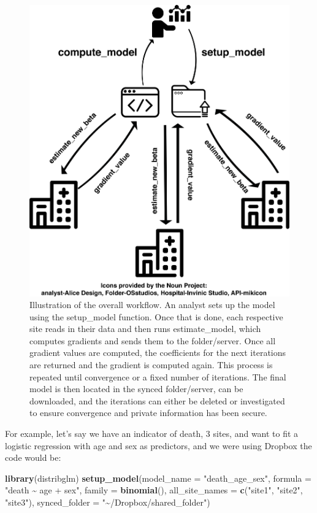 \documentclass[]{elsarticle} %
\newenvironment{Shaded}{\begin{snugshade}}{\end{snugshade}}
\newcommand{\DataTypeTok}[1]{\textcolor[rgb]{0.13,0.29,0.53}{#1}}
\newcommand{\KeywordTok}[1]{\textcolor[rgb]{0.13,0.29,0.53}{\textbf{#1}}}
\newcommand{\NormalTok}[1]{#1}
\newcommand{\StringTok}[1]{\textcolor[rgb]{0.31,0.60,0.02}{#1}}
\begin{document}
\begin{figure}
\centering
\includegraphics{workflow.png}
\caption{\label{fig:workflow}Illustration of the overall workflow. An analyst sets up the model using the setup\_model function. Once that is done, each respective site reads in their data and then runs estimate\_model, which computes gradients and sends them to the folder/server. Once all gradient values are computed, the coefficients for the next iterations are returned and the gradient is computed again. This process is repeated until convergence or a fixed number of iterations. The final model is then located in the synced folder/server, can be downloaded, and the iterations can either be deleted or investigated to ensure convergence and private information has been secure.}
\end{figure}

For example, let's say we have an indicator of death, 3 sites, and want to fit a logistic regression with age and sex as predictors, and we were using Dropbox the code would be:

\begin{Shaded}
\begin{Highlighting}[]
\KeywordTok{library}\NormalTok{(distribglm)}
\KeywordTok{setup\_model}\NormalTok{(}\DataTypeTok{model\_name =} \StringTok{"death\_age\_sex"}\NormalTok{, }
            \DataTypeTok{formula =} \StringTok{"death \textasciitilde{} age + sex"}\NormalTok{, }
            \DataTypeTok{family =} \KeywordTok{binomial}\NormalTok{(), }
            \DataTypeTok{all\_site\_names =} \KeywordTok{c}\NormalTok{(}\StringTok{"site1"}\NormalTok{, }\StringTok{"site2"}\NormalTok{, }\StringTok{"site3"}\NormalTok{),}
            \DataTypeTok{synced\_folder =} \StringTok{"\textasciitilde{}/Dropbox/shared\_folder"}\NormalTok{)}
\end{Highlighting}
\end{Shaded}
\end{document}
